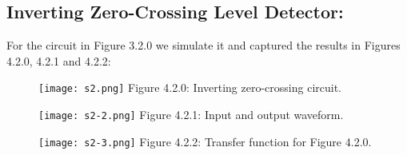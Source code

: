\subsection{Inverting Zero-Crossing Level Detector:}

For the circuit in Figure 3.2.0 we simulate it and captured the results in Figures 4.2.0, 4.2.1 and 4.2.2:

\begin{figure}[H]
\texttt{[image: s2.png]}
\centering \linebreak \linebreak Figure 4.2.0: Inverting zero-crossing circuit.
\end{figure} \hfill

\begin{multicols}{2}
\begin{figure}[H]
\texttt{[image: s2-2.png]}
\centering \linebreak \linebreak Figure 4.2.1: Input and output waveform.
\end{figure} \hfill

\begin{figure}[H]
\texttt{[image: s2-3.png]}
\centering \linebreak \linebreak Figure 4.2.2: Transfer function for Figure 4.2.0.
\end{figure} \hfill
\end{multicols} 

\pagebreak